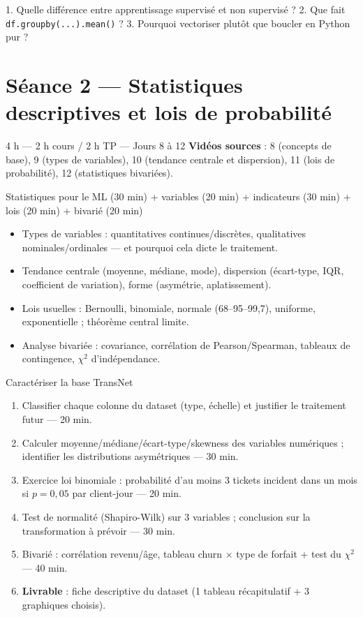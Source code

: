 \documentclass[11pt,a4paper]{article}
\begin{document}
\begin{evalbox}
1. Quelle différence entre apprentissage supervisé et non supervisé ? 2. Que fait \texttt{df.groupby(...).mean()} ? 3. Pourquoi vectoriser plutôt que boucler en Python pur ?
\end{evalbox}

\section*{Séance 2 — Statistiques descriptives et lois de probabilité}
\begin{seancebox}{4 h — 2 h cours / 2 h TP — Jours 8 à 12}
\textbf{Vidéos sources} : 8 (concepts de base), 9 (types de variables), 10 (tendance centrale et dispersion), 11 (lois de probabilité), 12 (statistiques bivariées).
\end{seancebox}
\begin{coursbox}{Statistiques pour le ML (30 min) + variables (20 min) + indicateurs (30 min) + lois (20 min) + bivarié (20 min)}
\begin{itemize}[nosep]
\item Types de variables : quantitatives continues/discrètes, qualitatives nominales/ordinales — et pourquoi cela dicte le traitement.
\item Tendance centrale (moyenne, médiane, mode), dispersion (écart-type, IQR, coefficient de variation), forme (asymétrie, aplatissement).
\item Lois usuelles : Bernoulli, binomiale, normale (68--95--99,7), uniforme, exponentielle ; théorème central limite.
\item Analyse bivariée : covariance, corrélation de Pearson/Spearman, tableaux de contingence, $\chi^2$ d'indépendance.
\end{itemize}
\end{coursbox}
\begin{tpbox}{Caractériser la base TransNet}
\begin{enumerate}[nosep]
\item Classifier chaque colonne du dataset (type, échelle) et justifier le traitement futur — 20 min.
\item Calculer moyenne/médiane/écart-type/skewness des variables numériques ; identifier les distributions asymétriques — 30 min.
\item Exercice loi binomiale : probabilité d'au moins 3 tickets incident dans un mois si $p=0{,}05$ par client-jour — 20 min.
\item Test de normalité (Shapiro-Wilk) sur 3 variables ; conclusion sur la transformation à prévoir — 30 min.
\item Bivarié : corrélation revenu/âge, tableau churn $\times$ type de forfait + test du $\chi^2$ — 40 min.
\item \textbf{Livrable} : fiche descriptive du dataset (1 tableau récapitulatif + 3 graphiques choisis).
\end{enumerate}
\end{tpbox}
\end{document}

